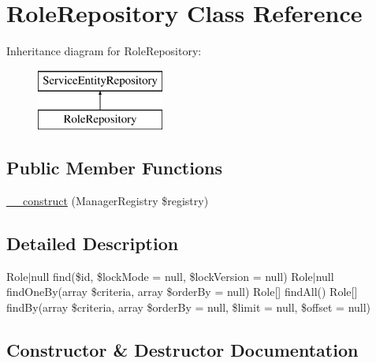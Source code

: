 \hypertarget{class_app_1_1_repository_1_1_role_repository}{}\section{Role\+Repository Class Reference}
\label{class_app_1_1_repository_1_1_role_repository}
Inheritance diagram for Role\+Repository\+:\begin{figure}[H]
\begin{center}
\leavevmode
\includegraphics[height=2.000000cm]{class_app_1_1_repository_1_1_role_repository}
\end{center}
\end{figure}
\subsection*{Public Member Functions}
\begin{DoxyCompactItemize}
\item 
\mbox{\hyperlink{class_app_1_1_repository_1_1_role_repository_a38ea33dde11163765f358f5f10a3bc03}{\+\_\+\+\_\+construct}} (Manager\+Registry \$registry)
\end{DoxyCompactItemize}


\subsection{Detailed Description}
Role$\vert$null find(\$id, \$lock\+Mode = null, \$lock\+Version = null)  Role$\vert$null find\+One\+By(array \$criteria, array \$order\+By = null)  Role\mbox{[}\mbox{]} find\+All()  Role\mbox{[}\mbox{]} find\+By(array \$criteria, array \$order\+By = null, \$limit = null, \$offset = null) 

\subsection{Constructor \& Destructor Documentation}
\mbox{\label{class_app_1_1_repository_1_1_role_repository_a38ea33dde11163765f358f5f10a3bc03}} 
